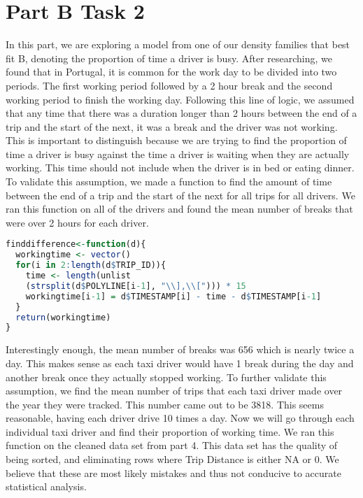 \documentclass{article}
\begin{document}
\section{Part B Task 2}
In this part, we are exploring a model from one of our density families that best fit B, denoting the proportion of time a driver is busy. After researching, we found that in Portugal, it is common for the work day to be divided into two periods. The first working period followed by a 2 hour break and the second working period to finish the working day. Following this line of logic, we assumed that any time that there was a duration longer than 2 hours between the end of a trip and the start of the next, it was a break and the driver was not working. This is important to distinguish because we are trying to find the proportion of time a driver is busy against the time a driver is waiting when they are actually working. This time should not include when the driver is in bed or eating dinner. To validate this assumption, we made a function to find the amount of time between the end of a trip and the start of the next for all trips for all drivers. We ran this function on all of the drivers and found the mean number of breaks that were over 2 hours for each driver.
\begin{lstlisting}[language=R]
finddifference<-function(d){ 
  workingtime <- vector()
  for(i in 2:length(d$TRIP_ID)){
    time <- length(unlist
    (strsplit(d$POLYLINE[i-1], "\\],\\["))) * 15 
    workingtime[i-1] = d$TIMESTAMP[i] - time - d$TIMESTAMP[i-1] 
  }
  return(workingtime)
}
\end{lstlisting}





Interestingly enough, the mean number of breaks was 656 which is nearly twice a day. This makes sense as each taxi driver would have 1 break during the day and another break once they actually stopped working. To further validate this assumption, we find the mean number of trips that each taxi driver made over the year they were tracked. This number came out to be 3818. This seems reasonable, having each driver drive 10 times a day. Now we will go through each individual taxi driver and find their proportion of working time. We ran this function on the cleaned data set from part 4. This data set has the quality of being sorted, and eliminating rows where Trip Distance is either NA or 0. We believe that these are most likely mistakes and thus not conducive to accurate statistical analysis.
\end{document}
